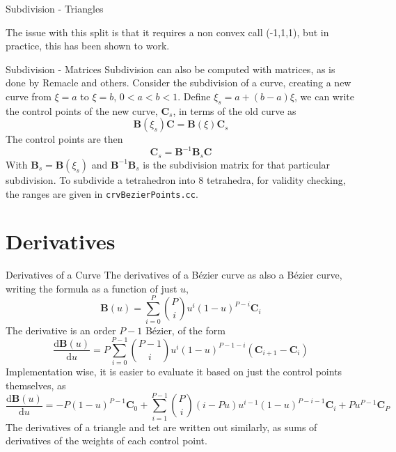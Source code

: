 \documentclass[12pt]{beamer}
\begin{document}
\begin{frame}{Subdivision - Triangles}
\begin{figure}
\end{figure}
The issue with this split is that it requires a non convex call (-1,1,1), but in practice, this has been shown to work.
\end{frame}
\begin{frame}{Subdivision - Matrices}
Subdivision can also be computed with matrices, as is done by Remacle and others. Consider the subdivision of a curve, creating a new curve from $\xi = a$ to $\xi = b$, $0 < a < b < 1$. Define $\xi_s = a+(b-a)\xi$, we can write the control points of the new curve, $\mathbf{C}_s$, in terms of the old curve as
\[
\mathbf{B}(\xi_s)\mathbf{C} = \mathbf{B}(\xi)\mathbf{C}_s
\]
The control points are then 
\[ 
\mathbf{C}_s = \mathbf{B}^{-1}\mathbf{B}_s \mathbf{C}
\]
With $\mathbf{B}_s = \mathbf{B}(\xi_s)$ and $\mathbf{B}^{-1}\mathbf{B}_s$ is the subdivision matrix for that particular subdivision. To subdivide a tetrahedron into 8 tetrahedra, for validity checking, the ranges are given in \texttt{crvBezierPoints.cc}.
\end{frame}
\section{Derivatives}
\begin{frame}{Derivatives of a Curve}
The derivatives of a B{\'e}zier curve as also a B{\'e}zier curve, writing the formula as a function of just $u$,
\[ \mathbf{B}(u) = \displaystyle \sum_{i=0}^{P} {P \choose i}u^i(1-u)^{P-i}\mathbf{C}_{i}   \]
The derivative is an order $P-1$ B{\'e}zier, of the form 
\[
\frac{\mathrm{d} \mathbf{B}(u)}{\mathrm{d} u} = P \displaystyle\sum_{i=0}^{P-1}  {P-1 \choose i}u^i(1-u)^{P-1-i}(\mathbf{C}_{i+1}-\mathbf{C}_i)
\]
Implementation wise, it is easier to evaluate it based on just the control points themselves, as
{
  \footnotesize
\[
\frac{\mathrm{d} \mathbf{B}(u)}{\mathrm{d} u} = -P(1-u)^{P-1}\mathbf{C}_0+\displaystyle \sum_{i=1}^{P-1} {P \choose i}(i-Pu)u^{i-1}(1-u)^{P-i-1}\mathbf{C}_i + Pu^{P-1}\mathbf{C}_P
\]
}
The derivatives of a triangle and tet are written out similarly, as sums of derivatives of the weights of each control point.
\end{frame}
\end{document}
